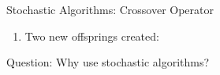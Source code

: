 \documentclass{beamer}
\begin{document}
\begin{frame}[t]{Stochastic Algorithms: Crossover Operator}
\begin{enumerate}
        \item Two new offsprings created:\par
            \begin{minipage}[t]{\linewidth}
                \centering
            \end{minipage}
    \end{enumerate}
\end{frame}

\begin{frame}{\null}
    \begin{tcolorbox}[colback=green!5]
        \centering
        Question: Why use stochastic algorithms?
    \end{tcolorbox}
\end{frame}
\end{document}
